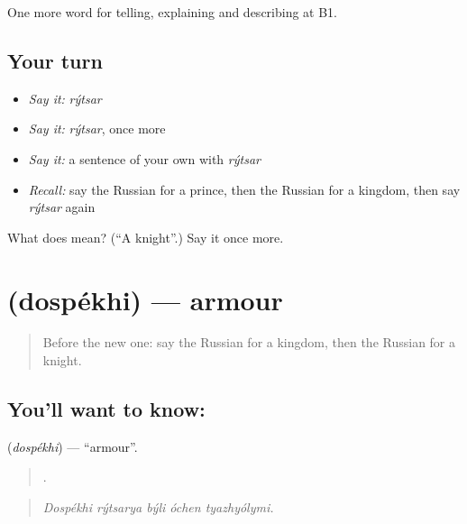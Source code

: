 \begin{grammarlens}[title={What you've built}]
One more word for telling, explaining and describing at B1.
\end{grammarlens}

\subsection*{Your turn}
\begin{itemize}
\raggedright
  \item \emph{Say it:} \emph{rýtsar}
  \item \emph{Say it:} \emph{rýtsar}, once more
  \item \emph{Say it:} a sentence of your own with \emph{rýtsar}
  \item \emph{Recall:} say the Russian for a prince, then the Russian for a kingdom, then say \emph{rýtsar} again
\end{itemize}

\begin{tcolorbox}[breakable,colback=teal!4,colframe=teal!35!black,title={Before you move on}]
What does  mean? (\textquotedblleft{}A knight\textquotedblright{}.) Say it once more.
\end{tcolorbox}
\section[\texorpdfstring{\ru{доспехи} (dospékhi)}{доспехи (dospékhi)}]{ (dospékhi) — armour}

\label{lesson:RU-C322-dospekhi}



\begin{quote}
Before the new one: say the Russian for a kingdom, then the Russian for a knight.
\end{quote}

\subsection*{You'll want to know: }
\textbf{} (\emph{dospékhi}) — \textquotedblleft{}armour\textquotedblright{}.

\begin{quote}
    .
\end{quote}

\begin{quote}
\emph{Dospékhi rýtsarya býli óchen tyazhyólymi.}
\end{quote}

